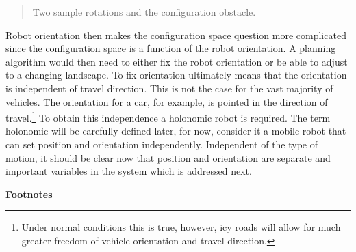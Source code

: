 \begin{quote}
Two sample rotations and the configuration obstacle.
\end{quote}

Robot orientation then makes the configuration space question more
complicated since the configuration space is a function of the robot
orientation. A planning algorithm would then need to either fix the
robot orientation or be able to adjust to a changing landscape. To fix
orientation ultimately means that the orientation is independent of
travel direction. This is not the case for the vast majority of
vehicles. The orientation for a car, for example, is pointed in the
direction of travel.\footnote{Under normal conditions this is true,
  however, icy roads will allow for much greater freedom of vehicle
  orientation and travel direction.} To obtain this independence a
holonomic robot is required. The term holonomic will be carefully
defined later, for now, consider it a mobile robot that can set position
and orientation independently. Independent of the type of motion, it
should be clear now that position and orientation are separate and
important variables in the system which is addressed next.

\textbf{Footnotes}
